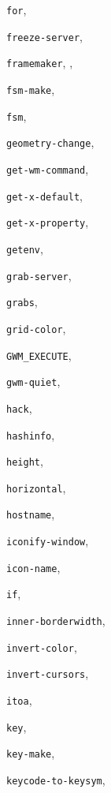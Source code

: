 \begin{theindex}
\item {\tt for}, {\bf\pageref{for}}
\item {\tt freeze-server}, {\bf\pageref{freeze-server}}
\item {\tt framemaker}, {\bf\pageref{framemaker}}, \pageref{map-on-raise}
\item {\tt fsm-make}, {\bf\pageref{fsm-make}}
\item {\tt fsm}, {\bf\pageref{fsm}}
\item {\tt geometry-change}, {\bf\pageref{geometry-change}}
\item {\tt get-wm-command}, {\bf\pageref{get-wm-command}}
\item {\tt get-x-default}, {\bf\pageref{get-x-default}}
\item {\tt get-x-property}, {\bf\pageref{get-x-property}}
\item {\tt getenv}, {\bf\pageref{getenv}}
\item {\tt grab-server}, {\bf\pageref{grab-server}}
\item {\tt grabs}, {\bf\pageref{grabs}}
\item {\tt grid-color}, {\bf\pageref{grid-color}}
\item {\tt GWM\_EXECUTE}, {\bf\pageref{GWM_EXECUTE}}
\item {\tt gwm-quiet}, {\bf\pageref{gwm-quiet}}
\item {\tt hack}, {\bf\pageref{hack}}
\item {\tt hashinfo}, {\bf\pageref{hashinfo}}
\item {\tt height}, {\bf\pageref{height}}
\item {\tt horizontal}, {\bf\pageref{horizontal}}
\item {\tt hostname}, {\bf\pageref{hostname}}
\item {\tt iconify-window}, {\bf\pageref{iconify-window}}
\item {\tt icon-name}, {\bf\pageref{icon-name}}
\item {\tt if}, {\bf\pageref{if}}
\item {\tt inner-borderwidth}, {\bf\pageref{inner-borderwidth}}
\item {\tt invert-color}, {\bf\pageref{invert-color}}
\item {\tt invert-cursors}, {\bf\pageref{invert-cursors}}
\item {\tt itoa}, {\bf\pageref{itoa}}
\item {\tt key}, {\bf\pageref{key}}
\item {\tt key-make}, {\bf\pageref{key-make}}
\item {\tt keycode-to-keysym}, {\bf\pageref{keycode-to-keysym}}

\end{theindex}

